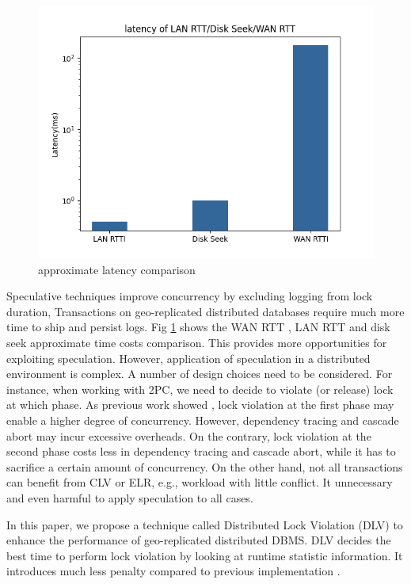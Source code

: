 \documentclass[conference]{IEEEtran}
\begin{document}
\begin{figure}[htbp]
  \centerline{\includegraphics[scale=0.4]{figure/log_write_latency.png}}
  \caption{approximate latency comparison\cite{Latency}}
  \label{fig:log_write_latency}
\end{figure}

Speculative techniques improve concurrency by excluding logging from lock duration,
Transactions on geo-replicated distributed databases require much more time to ship and persist logs.
Fig \ref{fig:log_write_latency} shows the WAN RTT , LAN RTT and disk seek approximate time costs comparison.
This provides more opportunities for exploiting speculation.
However, application of speculation in a distributed environment is complex.
A number of design choices need to be considered.
For instance, when working with 2PC, we need to decide to violate (or release) lock at which phase.
As previous work showed \cite{CLV:conf/sigmod/GraefeLKTV13}, lock violation at the first phase may enable a higher degree of concurrency.
However, dependency tracing and cascade abort may incur excessive overheads.
On the contrary, lock violation at the second phase costs less in dependency tracing and cascade abort, while it has to sacrifice a certain amount of concurrency.
On the other hand, not all transactions can benefit from CLV or ELR, e.g., workload with little conflict.
It unnecessary and even harmful to apply speculation to all cases.

In this paper, we propose a technique called Distributed Lock Violation (DLV) to enhance the performance of geo-replicated distributed DBMS.
DLV decides the best time to perform lock violation by looking at runtime statistic information.
It introduces much less penalty compared to previous implementation \cite{CLV:conf/sigmod/GraefeLKTV13}.
\end{document}
